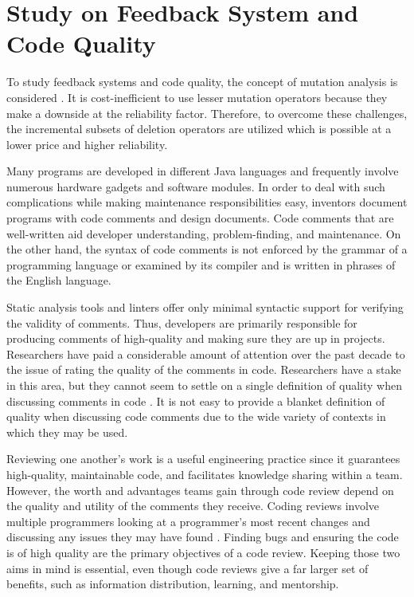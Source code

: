 \section{Study on Feedback System and Code Quality}
To study feedback systems and code quality, the concept of mutation analysis is considered \cite{ref17}. It is cost-inefficient to use lesser mutation operators because they make a downside at the reliability factor. Therefore, to overcome these challenges, the incremental subsets of deletion operators are utilized which is possible at a lower price and higher reliability.\par 
Many programs are developed in different Java languages and frequently involve numerous hardware gadgets and software modules. In order to deal with such complications while making maintenance responsibilities easy, inventors document programs with code comments and design documents. Code comments that are well-written aid developer understanding, problem-finding, and maintenance. On the other hand, the syntax of code comments is not enforced by the grammar of a programming language or examined by its compiler and is written in phrases of the English language.\par 
Static analysis tools and linters offer only minimal syntactic support for verifying the validity of comments. Thus, developers are primarily responsible for producing comments of high-quality and making sure they are up in projects. Researchers have paid a considerable amount of attention over the past decade to the issue of rating the quality of the comments in code. Researchers have a stake in this area, but they cannot seem to settle on a single definition of quality when discussing comments in code \cite{ref18}. It is not easy to provide a blanket definition of quality when discussing code comments due to the wide variety of contexts in which they may be used.\par 
Reviewing one another's work is a useful engineering practice since it guarantees high-quality, maintainable code, and facilitates knowledge sharing within a team. However, the worth and advantages teams gain through code review depend on the quality and utility of the comments they receive. Coding reviews involve multiple programmers looking at a programmer's most recent changes and discussing any issues they may have found \cite{ref19}. Finding bugs and ensuring the code is of high quality are the primary objectives of a code review. Keeping those two aims in mind is essential, even though code reviews give a far larger set of benefits, such as information distribution, learning, and mentorship. \par 
